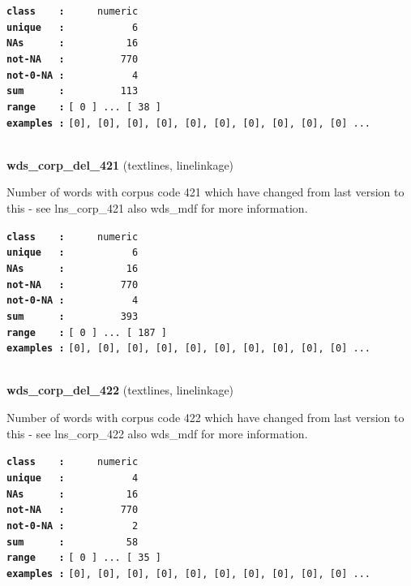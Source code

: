 \documentclass[]{article}
\begin{document}
\textbf{\texttt{class\ \ \ \ :}} \texttt{~~~~~numeric}\\
\textbf{\texttt{unique\ \ \ :}} \texttt{~~~~~~~~~~~6}\\
\textbf{\texttt{NAs\ \ \ \ \ \ :}} \texttt{~~~~~~~~~~16}\\
\textbf{\texttt{not-NA\ \ \ :}} \texttt{~~~~~~~~~770}\\
\textbf{\texttt{not-0-NA\ :}} \texttt{~~~~~~~~~~~4}\\
\textbf{\texttt{sum\ \ \ \ \ \ :}} \texttt{~~~~~~~~~113}\\
\textbf{\texttt{range\ \ \ \ :}}
\texttt{{[}\ 0\ {]}\ ...\ {[}\ 38\ {]}}\\
\textbf{\texttt{examples\ :}}
\texttt{{[}0{]},\ {[}0{]},\ {[}0{]},\ {[}0{]},\ {[}0{]},\ {[}0{]},\ {[}0{]},\ {[}0{]},\ {[}0{]},\ {[}0{]}\ ...}\\

~

\textbf{wds\_corp\_del\_421} (textlines, linelinkage)

Number of words with corpus code 421 which have changed from last
version to this - see lns\_corp\_421 also wds\_mdf for more information.

\textbf{\texttt{class\ \ \ \ :}} \texttt{~~~~~numeric}\\
\textbf{\texttt{unique\ \ \ :}} \texttt{~~~~~~~~~~~6}\\
\textbf{\texttt{NAs\ \ \ \ \ \ :}} \texttt{~~~~~~~~~~16}\\
\textbf{\texttt{not-NA\ \ \ :}} \texttt{~~~~~~~~~770}\\
\textbf{\texttt{not-0-NA\ :}} \texttt{~~~~~~~~~~~4}\\
\textbf{\texttt{sum\ \ \ \ \ \ :}} \texttt{~~~~~~~~~393}\\
\textbf{\texttt{range\ \ \ \ :}}
\texttt{{[}\ 0\ {]}\ ...\ {[}\ 187\ {]}}\\
\textbf{\texttt{examples\ :}}
\texttt{{[}0{]},\ {[}0{]},\ {[}0{]},\ {[}0{]},\ {[}0{]},\ {[}0{]},\ {[}0{]},\ {[}0{]},\ {[}0{]},\ {[}0{]}\ ...}\\

~

\textbf{wds\_corp\_del\_422} (textlines, linelinkage)

Number of words with corpus code 422 which have changed from last
version to this - see lns\_corp\_422 also wds\_mdf for more information.

\textbf{\texttt{class\ \ \ \ :}} \texttt{~~~~~numeric}\\
\textbf{\texttt{unique\ \ \ :}} \texttt{~~~~~~~~~~~4}\\
\textbf{\texttt{NAs\ \ \ \ \ \ :}} \texttt{~~~~~~~~~~16}\\
\textbf{\texttt{not-NA\ \ \ :}} \texttt{~~~~~~~~~770}\\
\textbf{\texttt{not-0-NA\ :}} \texttt{~~~~~~~~~~~2}\\
\textbf{\texttt{sum\ \ \ \ \ \ :}} \texttt{~~~~~~~~~~58}\\
\textbf{\texttt{range\ \ \ \ :}}
\texttt{{[}\ 0\ {]}\ ...\ {[}\ 35\ {]}}\\
\textbf{\texttt{examples\ :}}
\texttt{{[}0{]},\ {[}0{]},\ {[}0{]},\ {[}0{]},\ {[}0{]},\ {[}0{]},\ {[}0{]},\ {[}0{]},\ {[}0{]},\ {[}0{]}\ ...}\\
\end{document}
